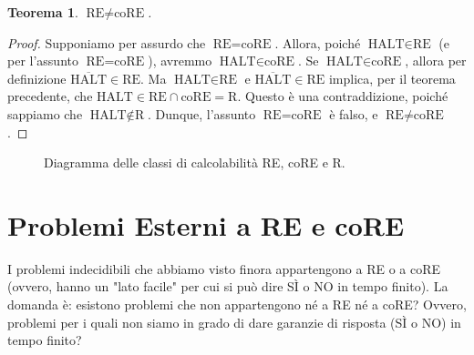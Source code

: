 \documentclass[a4paper, 11pt]{book} %
\newtheorem{theorem}{Teorema}[section]
\theoremstyle{definition}
\begin{document}
\begin{theorem}
$\text{RE} \neq \text{coRE}$.
\end{theorem}
\begin{proof}
Supponiamo per assurdo che $\text{RE} = \text{coRE}$.
Allora, poiché $\text{HALT} \in \text{RE}$ (e per l'assunto $\text{RE} = \text{coRE}$), avremmo $\text{HALT} \in \text{coRE}$.
Se $\text{HALT} \in \text{coRE}$, allora per definizione $\overline{\text{HALT}} \in \text{RE}$.
Ma $\text{HALT} \in \text{RE}$ e $\overline{\text{HALT}} \in \text{RE}$ implica, per il teorema precedente, che $\text{HALT} \in \text{RE} \cap \text{coRE} = \text{R}$.
Questo è una contraddizione, poiché sappiamo che $\text{HALT} \notin \text{R}$.
Dunque, l'assunto $\text{RE} = \text{coRE}$ è falso, e $\text{RE} \neq \text{coRE}$.
\end{proof}

\begin{figure}[h]
    \centering
    \caption{Diagramma delle classi di calcolabilit\`a RE, coRE e R.}
\end{figure}

\section{Problemi Esterni a RE e coRE}
I problemi indecidibili che abbiamo visto finora appartengono a RE o a coRE (ovvero, hanno un "lato facile" per cui si può dire SÌ o NO in tempo finito). La domanda è: esistono problemi che non appartengono né a RE né a coRE? Ovvero, problemi per i quali non siamo in grado di dare garanzie di risposta (SÌ o NO) in tempo finito?
\end{document}
